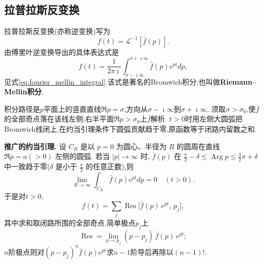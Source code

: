 \subsection{拉普拉斯反变换}
\label{subsec:inverse_laplace_transform}
拉普拉斯反变换(亦称逆变换)写为
\begin{equation}
    f(t) = \mathcal{L}^{-1} [ \bar{f}(p)].
\end{equation}
由傅里叶逆变换导出的具体表达式是
\begin{equation}
    f(t)=\frac{1}{2 \pi \imath} \int_{\sigma-\imath \infty}^{\sigma+\imath \infty} \bar{f}(p) e^{ p t} dp,
    \label{eq:bromwich_repeat}
\end{equation}
见式\eqref{eq:fourier_mellin_integral}.该式是著名的Bromwich积分,也叫做\textbf{Riemann--Mellin积分}.

积分路径是$p$平面上的竖直直线$\Re p=\sigma$,方向从$\sigma-\imath\infty$到$\sigma+\imath\infty$.
须取$\sigma>\sigma_0$,使$\bar{f}$的全部奇点落在该线左侧;右半平面$\Re p>\sigma_0$上$\bar{f}$解析.
$t>0$时用左侧大圆弧把Bromwich线闭上,在约当引理条件下圆弧贡献趋于零,原函数等于闭路内留数之和.

\textbf{推广的约当引理.}
设 $C_R$ 是以 $p=0$ 为圆心、半径为 $R$ 的圆周在直线 $\Re p=a(>0)$ 左侧的圆弧.
若当 $|p| \rightarrow \infty$ 时, $\bar{f}(p)$ 在
$\frac{\pi}{2}-\delta \leqslant \operatorname{Arg} p \leqslant \frac{3}{2} \pi+\delta$
中一致趋于零($\delta$ 是小于 $\frac{\pi}{2}$ 的任意正数),则
$$
\lim _{R \rightarrow \infty} \int_{C_R} \bar{f}(p) e^{p t} d p=0 \quad(t>0) .
$$
于是对$t>0$,
\begin{equation}
    f(t) = \sum_{j}\operatorname{Res}\bigl[\bar{f}(p)\,e^{pt},\,p_j\bigr],
\end{equation}
其中求和取闭路所围的全部奇点.简单极点$p_j$上
\[
  \operatorname{Res}
  =\lim_{p\to p_j}(p-p_j)\,\bar{f}(p)\,e^{pt};
\]
$n$阶极点则对$(p-p_j)^n\bar{f}(p)e^{pt}$求$n-1$阶导后再除以$(n-1)!$.

